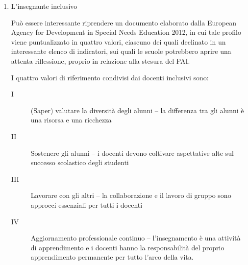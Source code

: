 \begin{description}
\begin{enumerate}
		Per approfondire i percorsi di auto-riflessione delle scuole sulla propria azione in termini di inclusione,
		si ricordano due importanti strumenti di lavoro, entrambi disponibili gratuitamente sul web.
		
		Il primo strumento è di derivazione inglese ma è disponibile in lingua italiana; si tratta dell'Index per
		l'inclusione di Toni Booth e Mel Ainscow.
	
		Il secondo strumento è il software Quadis elaborato dall'Ufficio Scolastico Regionale per la Lombardia.
		Per entrambi i link sono disponibili nel settore “Bisogni educativi speciali” del sito Internet di questa
		Direzione Generale \url{www.istruzioneer.it} cui si rimanda anche per materiali di approfondimento e di
		documentazione su vari argomenti.
		\item L'insegnante inclusivo
		
		Può essere interessante riprendere un documento elaborato dalla {\foreignlanguage{english}European Agency for Development} in {\foreignlanguage{english}Special Needs Education}  2012, in cui tale profilo viene puntualizzato
		in quattro valori, ciascuno dei quali declinato in un interessante elenco di indicatori, sui quali le scuole
		potrebbero aprire una attenta riflessione, proprio in relazione alla stesura del PAI.
		
		I quattro valori di riferimento condivisi dai docenti inclusivi sono:
		\begin{description}
			\item[I] (Saper) valutare la diversità degli alunni – la differenza tra gli alunni è una risorsa e una
			ricchezza
			\item [II] Sostenere gli alunni – i docenti devono coltivare aspettative alte sul successo scolastico degli
			studenti
			\item [III] Lavorare con gli altri – la collaborazione e il lavoro di gruppo sono approcci essenziali per tutti
			i docenti
			\item [IV] Aggiornamento professionale continuo – l'insegnamento è una attività di apprendimento e i
			docenti hanno la responsabilità del proprio apprendimento permanente per tutto l'arco della
			vita.
		\end{description}
		 

\end{enumerate}
\end{description}
